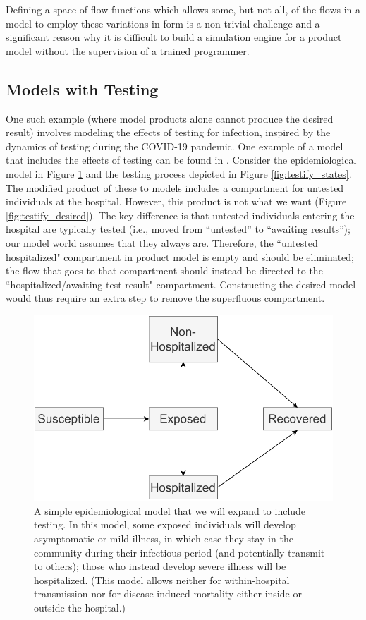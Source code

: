 \documentclass{article}
\theoremstyle{definition}
\begin{document}
Defining a space of flow functions which allows some, but not all, of the flows in a model to employ these variations in form is a non-trivial challenge and a significant reason why it is difficult to build a simulation engine for a product model without the supervision of a trained programmer.

\subsection{Models with Testing}\label{testing}

One such example (where model products alone cannot produce the desired result) involves modeling the effects of testing for infection, inspired by the dynamics of testing during the COVID-19 pandemic. One example of a model that includes the effects of testing can be found in \cite{gharouni2022testing}. Consider the epidemiological model in Figure \ref{fig:testify_epi} and the testing process depicted in Figure \ref{fig:testify_states}. The modified product of these to models includes a compartment for untested individuals at the hospital. However, this product is not what we want (Figure \ref{fig:testify_desired}). 
The key difference is that untested individuals entering the hospital are typically tested (i.e., moved from ``untested'' to ``awaiting results''); our model world assumes that they always are.
Therefore, the “untested hospitalized" compartment in product model is empty  and should be eliminated; the flow that goes to that compartment should instead be directed to the “hospitalized/awaiting test result" compartment. Constructing the desired model would thus require an extra step to remove the superfluous compartment.

\begin{figure}
    \centering
    \includegraphics[width=\textwidth]{images_pdf/SIR_w_Hospital.pdf}
    \caption{A simple epidemiological model that we will expand to include testing. In this model, some exposed individuals will develop asymptomatic or mild illness, in which case they stay in the community during their infectious period (and potentially transmit to others); those who instead develop severe illness will be hospitalized. (This model allows neither for within-hospital transmission nor for disease-induced mortality either inside or outside the hospital.)}
    \label{fig:testify_epi}
\end{figure}
\end{document}
